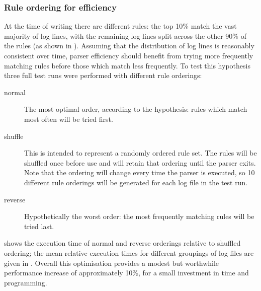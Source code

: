 \subsubsection{Rule ordering for efficiency}

\label{rule ordering for efficiency}

At the time of writing there are \numberOFrules{} different rules: the top
10\% match the vast majority of log lines, with the remaining log lines
split across the other 90\% of the rules (as shown in ).  Assuming that the distribution of log lines is reasonably
consistent over time, parser efficiency should benefit from trying more
frequently matching rules before those which match less frequently.  To
test this hypothesis three full test runs were performed with different
rule orderings:

\begin{description}

    \item [normal]  The most optimal order, according to the hypothesis:
        rules which match most often will be tried first.

    \item [shuffle] This is intended to represent a randomly ordered rule
        set.  The rules will be shuffled once before use and will retain
        that ordering until the parser exits.  Note that the ordering will
        change every time the parser is executed, so 10 different rule
        orderings will be generated for each log file in the test run.  

    \item [reverse] Hypothetically the worst order: the most frequently
        matching rules will be tried last.

\end{description}

 shows the
execution time of normal and reverse orderings relative to shuffled
ordering; the mean relative execution times for different groupings of log
files are given in .  Overall this optimisation provides a modest but worthwhile
performance increase of approximately 10\%, for a small investment in time
and programming.


